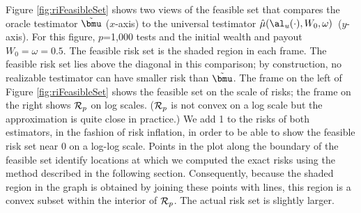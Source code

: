 \documentclass[12pt]{article}
\newcommand{\uTest}{\mbox{$\hat\mu(\al_u(\cdot),W_0,\omega)$}}
\begin{document}
 Figure \ref{fig:riFeasibleSet} shows two views of the feasible set that
 compares the oracle testimator $\tilde{\bmu}$ ($x$-axis) to the universal
 testimator \uTest\ ($y$-axis).  For this figure, $p$=1,000 tests and the
 initial wealth and payout $W_0 = \omega = 0.5$.  The feasible risk set is the
 shaded region in each frame.  The feasible risk set lies above the diagonal in
 this comparison; by construction, no realizable testimator can have smaller
 risk than $\tilde{\bmu}$.  The frame on the left of Figure
 \ref{fig:riFeasibleSet} shows the feasible set on the scale of risks; the frame
 on the right shows ${\cal R}_p$ on log scales.  (${\cal R}_p$ is not
 convex on a log scale but the approximation is quite close in practice.)  We
 add 1 to the risks of both estimators, in the fashion of risk inflation, in
 order to be able to show the feasible risk set near 0 on a log-log scale.
  Points in the plot along the boundary of the feasible set identify locations
 at which we computed the exact risks using the method described in the
 following section.  Consequently, because the shaded region in the graph is
 obtained by joining these points with lines, this region is a convex subset
 within the interior of ${\cal R}_p$.  The actual risk set is slightly larger.
\end{document}
